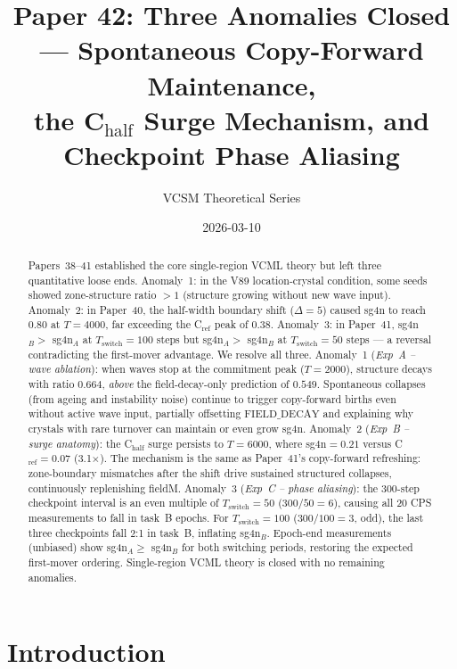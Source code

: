 \documentclass[11pt]{article}
\title{\textbf{Paper 42: Three Anomalies Closed ---
Spontaneous Copy-Forward Maintenance,\\
the C$_\mathrm{half}$ Surge Mechanism,
and Checkpoint Phase Aliasing}}
\author{VCSM Theoretical Series}
\date{2026-03-10}
\begin{document}
\maketitle

\begin{abstract}
Papers~38--41 established the core single-region VCML theory but left three
quantitative loose ends.
Anomaly~1: in the V89 location-crystal condition, some seeds showed
zone-structure ratio $> 1$ (structure growing without new wave input).
Anomaly~2: in Paper~40, the half-width boundary shift ($\Delta=5$) caused
sg4n to reach $0.80$ at $T=4000$, far exceeding the C$_\mathrm{ref}$ peak
of $0.38$.
Anomaly~3: in Paper~41, sg4n$_B > $ sg4n$_A$ at $T_\mathrm{switch}=100$
steps but sg4n$_A > $ sg4n$_B$ at $T_\mathrm{switch}=50$ steps --- a
reversal contradicting the first-mover advantage.
We resolve all three.
Anomaly~1 (\textit{Exp~A -- wave ablation}): when waves stop at the
commitment peak ($T=2000$), structure decays with ratio $0.664$, \emph{above}
the field-decay-only prediction of $0.549$.
Spontaneous collapses (from ageing and instability noise) continue to trigger
copy-forward births even without active wave input, partially offsetting
$\mathrm{FIELD\_DECAY}$ and explaining why crystals with rare turnover can
maintain or even grow sg4n.
Anomaly~2 (\textit{Exp~B -- surge anatomy}):
the C$_\mathrm{half}$ surge persists to $T=6000$, where sg4n$=0.21$
versus C$_\mathrm{ref}=0.07$ (3.1$\times$).
The mechanism is the same as Paper~41's copy-forward refreshing:
zone-boundary mismatches after the shift drive sustained structured collapses,
continuously replenishing fieldM.
Anomaly~3 (\textit{Exp~C -- phase aliasing}):
the 300-step checkpoint interval is an even multiple of $T_\mathrm{switch}=50$
($300/50=6$), causing all 20 CPS measurements to fall in task~B epochs.
For $T_\mathrm{switch}=100$ ($300/100=3$, odd), the last three checkpoints
fall 2:1 in task~B, inflating sg4n$_B$.
Epoch-end measurements (unbiased) show sg4n$_A \geq $ sg4n$_B$ for both
switching periods, restoring the expected first-mover ordering.
Single-region VCML theory is closed with no remaining anomalies.
\end{abstract}

\section{Introduction}
\end{document}
